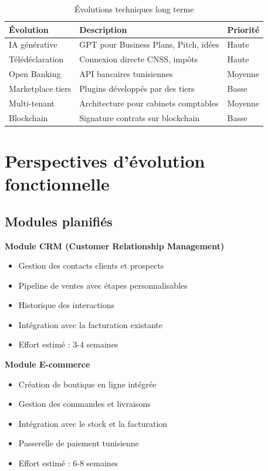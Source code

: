 \begin{table}[H]
\centering
\caption{Évolutions techniques long terme}
\label{tab:evol-long}
\begin{tabular}{|l|l|l|}
\hline
\textbf{Évolution} & \textbf{Description} & \textbf{Priorité} \\
\hline
IA générative & GPT pour Business Plans, Pitch, idées & Haute \\
\hline
Télédéclaration & Connexion directe CNSS, impôts & Haute \\
\hline
Open Banking & API bancaires tunisiennes & Moyenne \\
\hline
Marketplace tiers & Plugins développés par des tiers & Basse \\
\hline
Multi-tenant & Architecture pour cabinets comptables & Moyenne \\
\hline
Blockchain & Signature contrats sur blockchain & Basse \\
\hline
\end{tabular}
\end{table}

\section{Perspectives d'évolution fonctionnelle}

\subsection{Modules planifiés}

\textbf{Module CRM (Customer Relationship Management)}
\begin{itemize}
    \item Gestion des contacts clients et prospects
    \item Pipeline de ventes avec étapes personnalisables
    \item Historique des interactions
    \item Intégration avec la facturation existante
    \item Effort estimé : 3-4 semaines
\end{itemize}

\textbf{Module E-commerce}
\begin{itemize}
    \item Création de boutique en ligne intégrée
    \item Gestion des commandes et livraisons
    \item Intégration avec le stock et la facturation
    \item Passerelle de paiement tunisienne
    \item Effort estimé : 6-8 semaines
\end{itemize}

